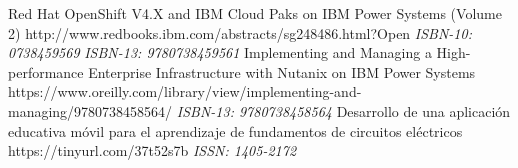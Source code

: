 %
%
%


\begin{publications}
    \publication
        {Red Hat OpenShift V4.X and IBM Cloud Paks on IBM Power Systems (Volume 2)}
        {http://www.redbooks.ibm.com/abstracts/sg248486.html?Open}
        \emph{ISBN-10: 0738459569}
        \newline
        \emph{ISBN-13: 9780738459561}
        \newline
    \publication
        {Implementing and Managing a High-performance Enterprise Infrastructure with Nutanix on IBM Power Systems}
        {https://www.oreilly.com/library/view/implementing-and-managing/9780738458564/}
        \emph{ISBN-13: 9780738458564}
        \newline
    \publication
        {Desarrollo de una aplicación educativa móvil para el aprendizaje de fundamentos de circuitos eléctricos}
        {https://tinyurl.com/37t52s7b}
        \emph{ISSN: 1405-2172}
        \newline
\end{publications}